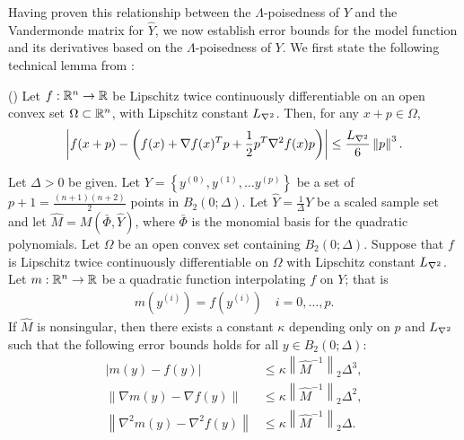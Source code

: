 \documentclass{article}
\newcommand{\real}{\mathbb R}
\begin{document}
Having proven this relationship between the $\Lambda$-poisedness of $Y$ and the Vandermonde matrix for $\hat{Y}$,  we now establish error bounds for the model function and its derivatives based on the $\Lambda$-poisedness of $Y$.   We first state the following technical lemma from \cite{dennisschnabel1983}:
\begin{lemma}(\cite[Lemma 4.1.14]{dennisschnabel1983})
\label{4_1_14}
Let $f : \mathbb R^n \to \mathbb R$ be Lipschitz twice continuously differentiable on an open convex set $\Omega \subset \mathbb R^n$,
with Lipschitz constant ${L_{\nabla^2}}$.
Then, for any $x + p\in \Omega$,
\begin{align*}
\left|f(x + p) - \left(f(x) + \nabla f(x)^T p + \frac 1 2 p^T \nabla^2 f(x)p\right) \right|
\le \frac {{L_{\nabla^2}}} 6 \left\|p\right\|^3.
\end{align*}
\end{lemma}
\begin{theorem}
\label{3_16_replacement2}
Let  $\Delta>0$  be given.  Let $Y = \left\{y^{(0)}, y^{(1)}, \ldots y^{(p)} \right\}$ be a set of $p+1=\frac{(n+1)(n+2)}{2}$ points in $B_2\left(0;\Delta\right)$.    Let  $\hat{Y}=\frac{1}{\Delta} Y$ be a scaled sample set and let $\hat{M} = M(\bar \Phi,\hat{Y})$, where $\bar \Phi$ is the monomial basis for  the quadratic polynomials.  Let $\Omega$ be an open convex set containing $B_2(0;\Delta)$.
Suppose that $f$ is Lipschitz twice continuously differentiable on $\Omega$ with Lipschitz constant ${L_{\nabla^2}}$.
Let $m: \Rn \rightarrow \real$ be a quadratic function interpolating $f$ on $Y$; that is 
\begin{align}
m\left(y^{(i)}\right) = f\left(y^{(i)}\right) \quad i=0,\ldots,p. \label{nce_interpolation_condition}
\end{align}
If $\hat{M}$ is nonsingular, then there exists a constant $\kappa$ depending only on $p$ and ${L_{\nabla^2}}$ such that the following error bounds holds for all $y \in B_2\left(0; \Delta\right)$:
\begin{align}
\left|m(y) - f(y)\right| &\le \kappa \left\|\hat M^{-1}\right\|_2 \Delta^3, \label{error_in_function}  \\
\left\|\nabla m(y) - \nabla f(y)\right\| &\le \kappa \left\|\hat M^{-1} \right\|_2\Delta^2, \label{error_in_gradient} \\
\left\|\nabla^2 m(y) - \nabla^2 f(y)\right\| &\le \kappa \left\|\hat M^{-1} \right\|_2\Delta. \label{error_in_hessian}
\end{align}
\end{theorem}
\end{document}
